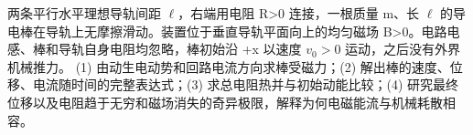 两条平行水平理想导轨间距 \(\ell \)，右端用电阻 R>0 连接，一根质量 m、长 \(\ell \) 的导电棒在导轨上无摩擦滑动。装置位于垂直导轨平面向上的均匀磁场 B>0。电路电感、棒和导轨自身电阻均忽略，棒初始沿 +x 以速度 \(v_{0}>0\) 运动，之后没有外界机械推力。
(1) 由动生电动势和回路电流方向求棒受磁力；(2) 解出棒的速度、位移、电流随时间的完整表达式；(3) 求总电阻热并与初始动能比较；(4) 研究最终位移以及电阻趋于无穷和磁场消失的奇异极限，解释为何电磁能流与机械耗散相容。
